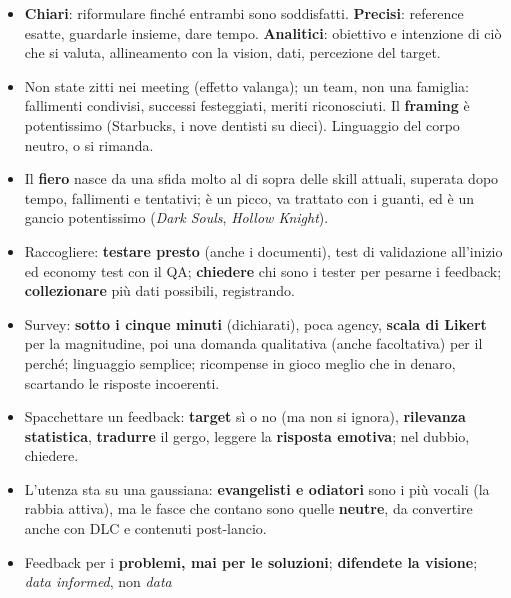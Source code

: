 \begin{itemize}
        \textbf{neutrale} (dice anche ciò che funziona, e perché, in uno
        stato emotivo neutro), \textbf{sincero} (tra adulti e professionisti),
        \textbf{risolutivo} (una soluzione suggerita, non imposta) e
        \textbf{senza giudizio}. La \textbf{tecnica del sandwich non
        funziona}: meglio una lista chiara.
  \item \textbf{Chiari}: riformulare finché entrambi sono soddisfatti.
        \textbf{Precisi}: reference esatte, guardarle insieme, dare tempo.
        \textbf{Analitici}: obiettivo e intenzione di ciò che si valuta,
        allineamento con la vision, dati, percezione del target.
  \item Non state zitti nei meeting (effetto valanga); un team, non una
        famiglia: fallimenti condivisi, successi festeggiati, meriti
        riconosciuti. Il \textbf{framing} è potentissimo (Starbucks, i nove
        dentisti su dieci). Linguaggio del corpo neutro, o si rimanda.
  \item Il \textbf{fiero} nasce da una sfida molto al di sopra delle skill
        attuali, superata dopo tempo, fallimenti e tentativi; è un picco, va
        trattato con i guanti, ed è un gancio potentissimo (\emph{Dark
        Souls}, \emph{Hollow Knight}).
  \item Raccogliere: \textbf{testare presto} (anche i documenti), test di
        validazione all'inizio ed economy test con il QA; \textbf{chiedere}
        chi sono i tester per pesarne i feedback; \textbf{collezionare} più
        dati possibili, registrando.
  \item Survey: \textbf{sotto i cinque minuti} (dichiarati), poca agency,
        \textbf{scala di Likert} per la magnitudine, poi una domanda
        qualitativa (anche facoltativa) per il perché; linguaggio semplice;
        ricompense in gioco meglio che in denaro, scartando le risposte
        incoerenti.
  \item Spacchettare un feedback: \textbf{target} sì o no (ma non si
        ignora), \textbf{rilevanza statistica}, \textbf{tradurre} il gergo,
        leggere la \textbf{risposta emotiva}; nel dubbio, chiedere.
  \item L'utenza sta su una gaussiana: \textbf{evangelisti e odiatori} sono
        i più vocali (la rabbia attiva), ma le fasce che contano sono quelle
        \textbf{neutre}, da convertire anche con DLC e contenuti post-lancio.
  \item Feedback per i \textbf{problemi, mai per le soluzioni};
        \textbf{difendete la visione}; \emph{data informed}, non \emph{data
}
\end{itemize}
